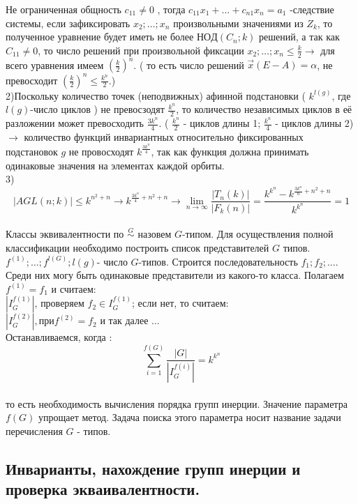 Не ограниченная общность $c_{11} \neq 0 $ , тогда $ c_{11} x_1 + \ldots + c_{n1} x_n = a_1 $ -следствие системы, если зафиксировать $x_2;\dots;x_n $ произвольными значениями из $Z_k $, то полученное уравнение будет иметь не более $НОД(C_n;k) $ решений, а так как $C_{11} \neq 0$, то число решений при произвольной фиксации $x_2;\dots;x_n \leqslant \frac{k}{2} \rightarrow $ для всего уравнения имеем $ (\frac {k}{2})^n$. ( то есть число решений $\vec{x}(E-A) = \alpha $, не превосходит $(\frac {k}{2})^n \leqslant \frac {k^n}{2} $.)\\
2)Поскольку количество точек (неподвижных) афинной подстановки ( $ k^{l(g)} $, где $l(g)$-число циклов ) не превосзодят $\frac {k^n}{2} $, то количество независимых циклов в её разложении может превосходить $\frac {3k^n}{4} $. ( $\frac {k^n}{2} $ - циклов длины 1; $\frac {k^n}{4} $ - циклов длины 2)\\
$\rightarrow $ количество функций инвариантных относительно фиксированных подстановок $g$ не провосходят $k^{\frac{3k^n}{4}}$, так как функция должна принимать одинаковые значения на элементах каждой орбиты. \\
3) $$|AGL(n;k)| \leqslant k^{n^2+n} \rightarrow k^{\frac{3k^n}{4} +n^2 +n} \rightarrow \lim_{n\to\infty} \frac{|T_n(k)|}{|F_k(n)|} = \frac {k^{k^n}-k^{\frac {3k^n}{n}+n^2+n}}{k^{k^n}}=1$$\\

Классы эквивалентности по $\stackrel{G}{\sim}$ назовем $G$-типом. Для осуществления полной классификации необходимо построить список представителей $G$ типов.
$f^{(1)};\dots; f^{l(G)}; l(g)$- число $G$-типов.
Строится последовательность $f_1;f_2;\dots $. Среди них могу быть одинаковые представители из какого-то класса. Полагаем $ f^{(1)}=f_1$ и считаем:\\ 
$|I_G^{f(1)}|$, проверяем $f_2 \in I_G^{f(1)}$; если нет, то считаем:\\
$|I_G^{f(2)}|, при f^{(2)} =f_2$ и так далее $\dots$\\
Останавливаемся, когда :\\
$$ \sum_{i=1}^{f(G)} \frac{|G|}{|I_G^{f(i)}|} = k^{k^n} $$\\ то есть необходимость вычисления порядка групп инерции. Значение параметра $f(G)$ упрощает метод. Задача поиска этого параметра носит название задачи перечисления $G$ - типов.\\

\subsection{Инварианты, нахождение групп инерции и проверка экваивалентности.}

